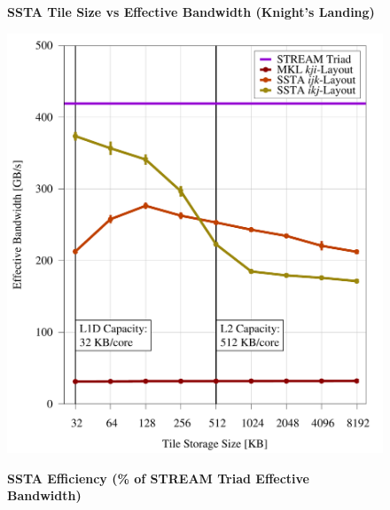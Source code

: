 \documentclass{sig-alternate-05-2015}
\begin{document}
\begin{figure}[!bth]
  \captionsetup{width=0.39\textwidth}
  \begin{minipage}{0.49\textwidth}
    \centering
    \label{fig:results:tile_size_knl}
    \caption{
      \textbf{SSTA Tile Size vs Effective Bandwidth (Knight's Landing)}
    }
    \includegraphics[width=0.95\columnwidth]{figures/post_tsb_tw_sweep_full_matrix_double_precision_production_carl_knl_7210_09_02_2016_64pus.pdf}
  \end{minipage}
  \begin{minipage}{0.49\textwidth}
    \centering
    \label{fig:results:efficiency}
    \caption{
      \textbf{SSTA Efficiency (\% of STREAM Triad Effective Bandwidth)}
    }

\end{minipage}
\end{figure}
\end{document}

